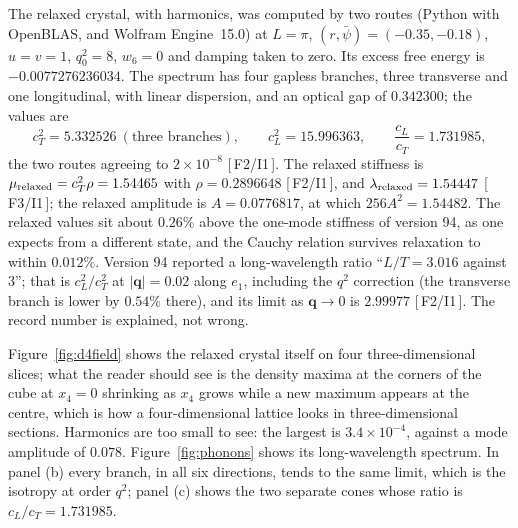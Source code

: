 \documentclass[a4paper,11pt]{article}
\numberwithin{equation}{section}
\theoremstyle{jsplain}
\theoremstyle{jsrem}
\newcommand{\grade}[1]{[\,#1\,]}
\begin{document}
The relaxed crystal, with harmonics, was computed by two routes (Python with OpenBLAS, and Wolfram Engine~15.0) at $L=\pi$, $(r,\bar\psi)=(-0.35,-0.18)$, $u=v=1$, $q_0^2=8$, $w_6=0$ and damping taken to zero. Its excess free energy is $-0.0077276236034$. The spectrum has four gapless branches, three transverse and one longitudinal, with linear dispersion, and an optical gap of $0.342300$; the values are
\[
c_T^2=5.332526\ (\text{three branches}),\qquad c_L^2=15.996363,\qquad \frac{c_L}{c_T}=1.731985,
\]
the two routes agreeing to $2\times10^{-8}$ \grade{F2/I1}. The relaxed stiffness is $\mu_{\rm relaxed}=c_T^2\rho=1.54465$ with $\rho=0.2896648$ \grade{F2/I1}, and $\lambda_{\rm relaxed}=1.54447$ \grade{F3/I1}; the relaxed amplitude is $A=0.0776817$, at which $256A^2=1.54482$. The relaxed values sit about $0.26\%$ above the one-mode stiffness of version 94, as one expects from a different state, and the Cauchy relation survives relaxation to within $0.012\%$. Version 94 reported a long-wavelength ratio ``$L/T=3.016$ against $3$''; that is $c_L^2/c_T^2$ at $|\mathbf{q}|=0.02$ along $e_1$, including the $q^2$ correction (the transverse branch is lower by $0.54\%$ there), and its limit as $\mathbf{q}\to0$ is $2.99977$ \grade{F2/I1}. The record number is explained, not wrong.

Figure~\ref{fig:d4field} shows the relaxed crystal itself on four three-dimensional slices; what the reader should see is the density maxima at the corners of the cube at $x_4=0$ shrinking as $x_4$ grows while a new maximum appears at the centre, which is how a four-dimensional lattice looks in three-dimensional sections. Harmonics are too small to see: the largest is $3.4\times10^{-4}$, against a mode amplitude of $0.078$. Figure~\ref{fig:phonons} shows its long-wavelength spectrum. In panel (b) every branch, in all six directions, tends to the same limit, which is the isotropy at order $q^2$; panel (c) shows the two separate cones whose ratio is $c_L/c_T=1.731985$.
\end{document}
